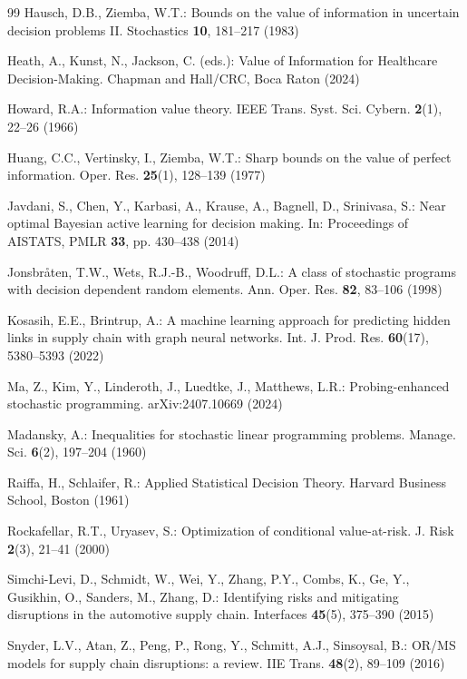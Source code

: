 \documentclass[pdflatex,sn-mathphys-num]{sn-jnl}
\theoremstyle{thmstyleone}
\theoremstyle{thmstyletwo}
\theoremstyle{thmstylethree}
\begin{document}
\begin{thebibliography}{99}
Hausch, D.B., Ziemba, W.T.: Bounds on the value of information in uncertain
decision problems II. Stochastics \textbf{10}, 181--217 (1983)

Heath, A., Kunst, N., Jackson, C. (eds.): Value of Information for
Healthcare Decision-Making. Chapman and Hall/CRC, Boca Raton (2024)

Howard, R.A.: Information value theory. IEEE Trans. Syst. Sci. Cybern.
\textbf{2}(1), 22--26 (1966)

Huang, C.C., Vertinsky, I., Ziemba, W.T.: Sharp bounds on the value of
perfect information. Oper. Res. \textbf{25}(1), 128--139 (1977)

Javdani, S., Chen, Y., Karbasi, A., Krause, A., Bagnell, D., Srinivasa, S.:
Near optimal Bayesian active learning for decision making. In: Proceedings
of AISTATS, PMLR \textbf{33}, pp. 430--438 (2014)

Jonsbr{\aa}ten, T.W., Wets, R.J.-B., Woodruff, D.L.: A class of stochastic
programs with decision dependent random elements. Ann. Oper. Res.
\textbf{82}, 83--106 (1998)

Kosasih, E.E., Brintrup, A.: A machine learning approach for predicting
hidden links in supply chain with graph neural networks. Int. J. Prod. Res.
\textbf{60}(17), 5380--5393 (2022)

Ma, Z., Kim, Y., Linderoth, J., Luedtke, J., Matthews, L.R.:
Probing-enhanced stochastic programming. arXiv:2407.10669 (2024)

Madansky, A.: Inequalities for stochastic linear programming problems.
Manage. Sci. \textbf{6}(2), 197--204 (1960)

Raiffa, H., Schlaifer, R.: Applied Statistical Decision Theory. Harvard
Business School, Boston (1961)

Rockafellar, R.T., Uryasev, S.: Optimization of conditional value-at-risk.
J. Risk \textbf{2}(3), 21--41 (2000)

Simchi-Levi, D., Schmidt, W., Wei, Y., Zhang, P.Y., Combs, K., Ge, Y.,
Gusikhin, O., Sanders, M., Zhang, D.: Identifying risks and mitigating
disruptions in the automotive supply chain. Interfaces \textbf{45}(5),
375--390 (2015)

Snyder, L.V., Atan, Z., Peng, P., Rong, Y., Schmitt, A.J., Sinsoysal, B.:
OR/MS models for supply chain disruptions: a review. IIE Trans.
\textbf{48}(2), 89--109 (2016)


\end{thebibliography}
\end{document}
